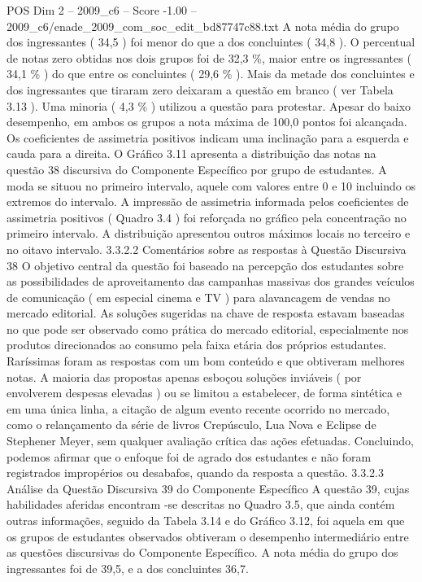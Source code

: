 \begin{textsample}{POS Dim 2 – 2009\_c6 – Score -1.00 – 2009\_c6/enade\_2009\_com\_soc\_edit\_bd87747c88.txt}
A nota média do grupo dos ingressantes ( 34,5 ) foi menor do que a dos concluintes ( 34,8 ).
O percentual de notas zero obtidas nos dois grupos foi de 32,3 \%, maior entre os ingressantes ( 34,1 \% ) do que entre os concluintes ( 29,6 \% ).
Mais da metade dos concluintes e dos ingressantes que tiraram zero deixaram a questão em branco ( ver Tabela 3.13 ).
Uma minoria ( 4,3 \% ) utilizou a questão para protestar.
Apesar do baixo desempenho, em ambos os grupos a nota máxima de 100,0 pontos foi alcançada.
Os coeficientes de assimetria positivos indicam uma inclinação para a esquerda e cauda para a direita.
O Gráfico 3.11 apresenta a distribuição das notas na questão 38 discursiva do Componente Específico por grupo de estudantes.
A moda se situou no primeiro intervalo, aquele com valores entre 0 e 10 incluindo os extremos do intervalo.
A impressão de assimetria informada pelos coeficientes de assimetria positivos ( Quadro 3.4 ) foi reforçada no gráfico pela concentração no primeiro intervalo.
A distribuição apresentou outros máximos locais no terceiro e no oitavo intervalo. 3.3.2.2 Comentários sobre as respostas à Questão Discursiva 38 O objetivo central da questão foi baseado na percepção dos estudantes sobre as possibilidades de aproveitamento das campanhas massivas dos grandes veículos de comunicação ( em especial cinema e TV ) para alavancagem de vendas no mercado editorial.
As soluções sugeridas na chave de resposta estavam baseadas no que pode ser observado como prática do mercado editorial, especialmente nos produtos direcionados ao consumo pela faixa etária dos próprios estudantes.
Raríssimas foram as respostas com um bom conteúdo e que obtiveram melhores notas.
A maioria das propostas apenas esboçou soluções inviáveis ( por envolverem despesas elevadas ) ou se limitou a estabelecer, de forma sintética e em uma única linha, a citação de algum evento recente ocorrido no mercado, como o relançamento da série de livros Crepúsculo, Lua Nova e Eclipse de Stephener Meyer, sem qualquer avaliação crítica das ações efetuadas.
Concluindo, podemos afirmar que o enfoque foi de agrado dos estudantes e não foram registrados impropérios ou desabafos, quando da resposta a questão. 3.3.2.3 Análise da Questão Discursiva 39 do Componente Específico A questão 39, cujas habilidades aferidas encontram -se descritas no Quadro 3.5, que ainda contém outras informações, seguido da Tabela 3.14 e do Gráfico 3.12, foi aquela em que os grupos de estudantes observados obtiveram o desempenho intermediário entre as questões discursivas do Componente Específico.
A nota média do grupo dos ingressantes foi de 39,5, e a dos concluintes 36,7.

\end{textsample}
